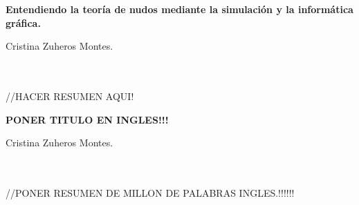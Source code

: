 
\cleardoublepage
\thispagestyle{empty}

\begin{center}
{\large\bfseries Entendiendo la teoría de nudos mediante la simulación y la informática gráfica.}\\
\end{center}
\begin{center}
Cristina Zuheros Montes.\\
\end{center}

\\

\vspace{0.7cm}
\\

//HACER RESUMEN AQUI!
 
\cleardoublepage


\thispagestyle{empty}

\begin{center}
{\large\bfseries PONER TITULO EN INGLES!!!}\\
\end{center}
\begin{center}
Cristina Zuheros Montes.\\
\end{center}

\\

\vspace{0.7cm}
\\

//PONER RESUMEN DE MILLON DE PALABRAS INGLES.!!!!!!\\




